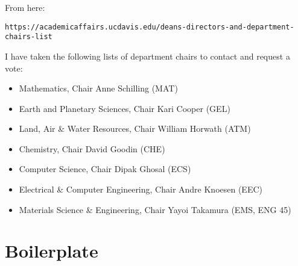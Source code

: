 \documentclass[12pt]{article}
\begin{document}
From here:
\begin{verbatim}
https://academicaffairs.ucdavis.edu/deans-directors-and-department-chairs-list
\end{verbatim}
I have taken the following lists of department chairs to contact and request a vote:

\begin{itemize}
\item Mathematics, Chair Anne Schilling (MAT) 
\item Earth and Planetary Sciences, Chair Kari Cooper (GEL) 
\item Land, Air \& Water Resources, Chair William Horwath (ATM)
\item Chemistry, Chair David Goodin (CHE)
\item Computer Science, Chair Dipak Ghosal (ECS)
\item Electrical \& Computer Engineering, Chair Andre Knoesen (EEC)
\item Materials Science \& Engineering, Chair Yayoi Takamura (EMS, ENG 45)
\end{itemize}

\section{Boilerplate}
\end{document}
